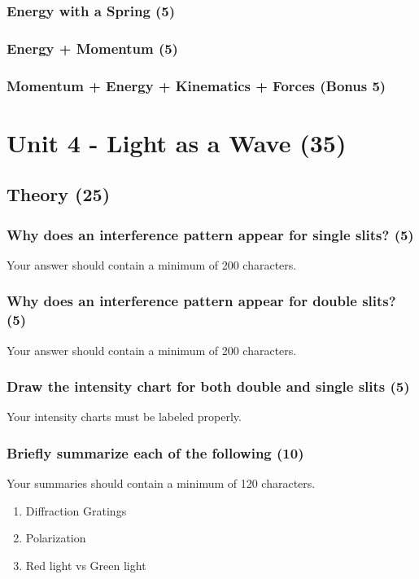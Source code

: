 \documentclass{article}
\begin{document}
\subsubsection{Energy with a Spring (5)}
\subsubsection{Energy + Momentum (5)}
\subsubsection{Momentum + Energy + Kinematics + Forces (Bonus 5)}



\section{Unit 4 - Light as a Wave (35)}
\subsection{Theory (25)}
\subsubsection{Why does an interference pattern appear for single slits? (5)}
Your answer should contain a minimum of 200 characters.

\subsubsection{Why does an interference pattern appear for double slits? (5)}
Your answer should contain a minimum of 200 characters.

\subsubsection{Draw the intensity chart for both double and single slits (5)}
Your intensity charts must be labeled properly.

\subsubsection{Briefly summarize each of the following (10)}
Your summaries should contain a minimum of 120 characters.
\begin{enumerate}[label=\alph*)]
    \item Diffraction Gratings
    \item Polarization
    \item Red light vs Green light
\end{enumerate}\leavevmode
\end{document}
